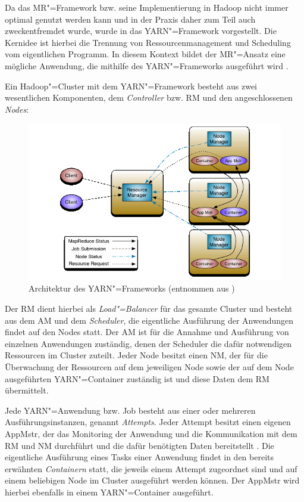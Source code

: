 Da das \gls{MR}"=Framework bzw. seine Implementierung in Hadoop nicht immer optimal genutzt werden kann und in der Praxis daher zum Teil auch zweckentfremdet wurde, wurde in \cite{Vavilapalli2013} das YARN"=Framework vorgestellt.
Die Kernidee ist hierbei die Trennung von Ressourcenmanagement und Scheduling vom eigentlichen Programm.
In diesem Kontext bildet der \gls{MR}"=Ansatz eine mögliche Anwendung, die mithilfe des YARN"=Frameworks ausgeführt wird \cite{Vavilapalli2013}.

Ein Hadoop"=Cluster mit dem YARN"=Framework besteht aus zwei wesentlichen Komponenten, dem \emph{Controller} bzw. \gls{RM} und den angeschlossenen \emph{Nodes}:

\begin{figure}[h]
    \includegraphics{./resources/yarn_architecture.png}
    \caption[Architektur des YARN"=Frameworks]
    {Architektur des YARN"=Frameworks (entnommen aus \cite{HadoopYarnArch271})}
    \label{fig:yarnarch}
\end{figure}

Der \gls{RM} dient hierbei als \emph{Load"=Balancer} für das gesamte Cluster und besteht aus dem \gls{AM} und dem \emph{Scheduler}, die eigentliche Ausführung der Anwendungen findet auf den Nodes statt.
Der \gls{AM} ist für die Annahme und Ausführung von einzelnen Anwendungen zuständig, denen der Scheduler die dafür notwendigen Ressourcen im Cluster zuteilt.
Jeder Node besitzt einen \gls{NM}, der für die Überwachung der Ressourcen auf dem jeweiligen Node sowie der auf dem Node ausgeführten YARN"=Container zuständig ist und diese Daten dem \gls{RM} übermittelt.

Jede YARN"=Anwendung bzw. Job besteht aus einer oder mehreren Ausführungsinstanzen, genannt \emph{Attempts}.
Jeder Attempt besitzt einen eigenen \gls{AppMstr}, der das Monitoring der Anwendung und die Kommunikation mit dem \gls{RM} und \gls{NM} durchführt und die dafür benötigten Daten bereitstellt \cite{HadoopYarnArch271}.
Die eigentliche Ausführung eines Tasks einer Anwendung findet in den bereits erwähnten \emph{Containern} statt, die jeweils einem Attempt zugeordnet sind und auf einem beliebigen Node im Cluster ausgeführt werden können.
Der \gls{AppMstr} wird hierbei ebenfalls in einem YARN"=Container ausgeführt.

